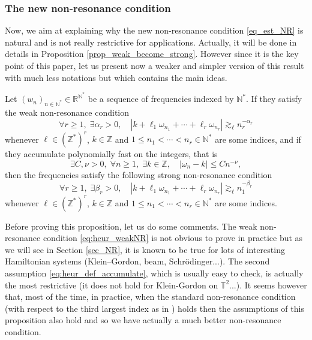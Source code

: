 \subsubsection*{The new non-resonance condition}
Now, we aim at explaining why the new non-resonance condition \eqref{eq_est_NR} is natural and is not really restrictive for applications. Actually, it will be done in details in Proposition \ref{prop_weak_become_strong}. However since it is the key point of this paper, let us present now a weaker and simpler version of this result with much less notations but which contains the main ideas.
\begin{proposition} \label{prop:heur_SD} Let $(w_n)_{n\in \mathbb{N}^*} \in \mathbb{R}^{\mathbb{N}^*}$ be a sequence of frequencies indexed by $\mathbb{N}^*$. If they satisfy the weak non-resonance condition
\begin{equation}
\label{eq:heur_weakNR}
\forall r\geq 1,\; \exists \alpha_r >0, \quad |k+\ell_1 \omega_{n_1} + \cdots + \ell_r \omega_{n_r}| \gtrsim_\ell n_r^{-\alpha_r}
\end{equation}
whenever $\ell \in (\mathbb{Z}^*)^r$, $k \in \mathbb{Z}$ and $1\leq n_1< \cdots < n_r \in \mathbb{N}^*$ are some indices, and if they accumulate polynomially fast on the integers, that is
\begin{equation}
\label{eq:heur_def_accumulate}
\exists C,\nu >0,\;\forall n \geq 1,\; \exists k \in \mathbb{Z}, \quad |\omega_n - k | \leq C n^{-\nu},
\end{equation}
then the frequencies satisfy the following strong non-resonance condition
\begin{equation}
\label{eq:heur_strongNR}
\forall r\geq 1,\; \exists \beta_r >0, \quad |k+\ell_1 \omega_{n_1} + \cdots + \ell_r \omega_{n_r}| \gtrsim_\ell n_1^{-\beta_r}
\end{equation}
whenever $\ell \in (\mathbb{Z}^*)^r$, $k \in \mathbb{Z}$ and $1\leq n_1< \cdots < n_r \in \mathbb{N}^*$ are some indices.
\end{proposition}
Before proving this proposition, let us do some comments. The weak non-resonance condition \eqref{eq:heur_weakNR} is not obvious to prove in practice but as we will see in Section \ref{sec_NR}, it is known to be true for lots of interesting Hamiltonian systems (Klein--Gordon, beam, Schrödinger...). The second assumption \eqref{eq:heur_def_accumulate}, which is usually easy to check, is actually the most restrictive (\eg it does not hold for Klein-Gordon on $\mathbb{T}^2$...). It seems however that, most of the time, in practice, when the standard non-resonance condition (\ie with respect to the third largest index as in \cite{Bam03}) holds then the assumptions of this proposition also hold and so we have actually a much better non-resonance condition.
